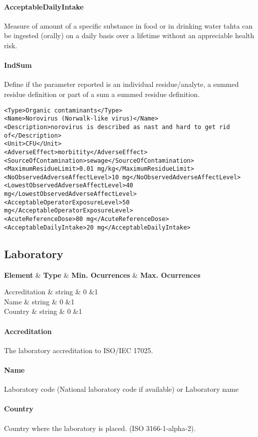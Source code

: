 \documentclass[a4paper]{report}
\def\starttable{%
    \tabular{|l|c|c|c|}
    \hline
    \textbf{Element} & \textbf{Type} & \textbf{Min. Ocurrences} & \textbf{Max. Ocurrences} \\    
    \hline
}
\def\R #1|#2|#3|#4{ #1&#2&#3&#4 \\}
\def\stoptable{%
    \hline \endtabular
}
\begin{document}
\paragraph{AcceptableDailyIntake}
Measure of amount of a specific substance in food or in drinking water tahta can be ingested (orally) on a daily basis over a lifetime without an appreciable health risk.

\paragraph{IndSum}
Define if the parameter reported is an individual residue/analyte, a summed residue definition or part of a sum a summed residue definition.

\begin{lstlisting}[language=RAKIP, caption={Example of Hazard}]
<Type>Organic contaminants</Type>
<Name>Norovirus (Norwalk-like virus)</Name>
<Description>norovirus is described as nast and hard to get rid
of</Description>
<Unit>CFU</Unit>
<AdverseEffect>morbitity</AdverseEffect>
<SourceOfContamination>sewage</SourceOfContamination>
<MaximumResidueLimit>0.01 mg/kg</MaximumResidueLimit>
<NoObservedAdverseAffectLevel>10 mg</NoObservedAdverseAffectLevel>
<LowestObservedAdverseAffectLevel>40 mg</LowestObservedAdverseAffectLevel>
<AcceptableOperatorExposureLevel>50 mg</AcceptableOperatorExposureLevel>
<AcuteReferenceDose>80 mg</AcuteReferenceDose>
<AcceptableDailyIntake>20 mg</AcceptableDailyIntake>
\end{lstlisting}

\subsection{Laboratory}
\label{class:Laboratory}

\starttable
    \R Accreditation | string | 0 | 1
    \R Name | string | 0 | 1
    \R Country | string | 0 | 1
\stoptable

\paragraph{Accreditation}
The laboratory accreditation to ISO/IEC 17025.

\paragraph{Name}
Laboratory code (National laboratory code if available) or Laboratory name 

\paragraph{Country}
Country where the laboratory is placed. (ISO 3166-1-alpha-2).
\end{document}
